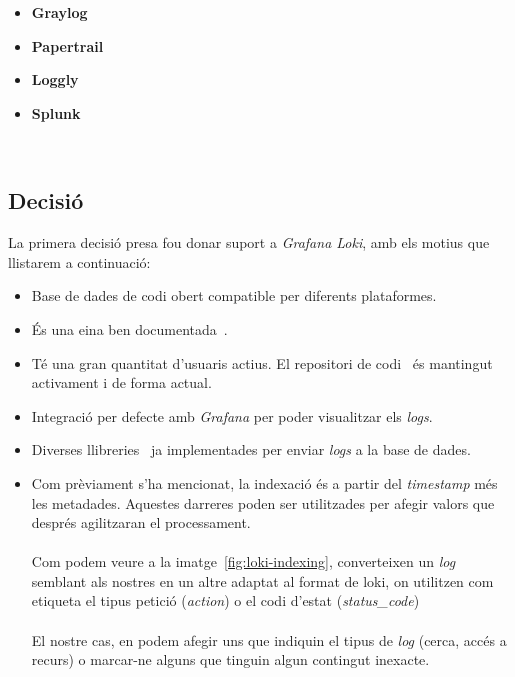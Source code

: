 \begin{itemize}
    \item \textbf{Graylog}~\cite{graylog}
    \item \textbf{Papertrail}~\cite{papertrail}
    \item \textbf{Loggly}~\cite{loggly}
    \item \textbf{Splunk}~\cite{splunk}
\end{itemize}

\noindent \\
\subsection{Decisió}\label{subsec:log-db-decision}

\noindent
La primera decisió presa fou donar suport a \textit{Grafana Loki}, amb els motius que llistarem a continuació:

\begin{itemize}
    \item Base de dades de codi obert compatible per diferents plataformes.
    \item És una eina ben documentada~\cite{loki:documentation}.
    \item Té una gran quantitat d’usuaris actius.
    El repositori de codi~\cite{loki:code} és mantingut activament i de forma actual.
    \item Integració per defecte amb \textit{Grafana} per poder visualitzar els \textit{logs}.
    \item Diverses llibreries~\cite{loki:libraries} ja implementades per enviar \textit{\gls{log}s} a la base de dades.
    \item Com prèviament s’ha mencionat, la indexació és a partir del \textit{\gls{timestamp}} més les metadades.
    Aquestes darreres poden ser utilitzades per afegir valors que després agilitzaran el processament. \\ \\
    Com podem veure a la imatge~\ref{fig:loki-indexing}, converteixen un \textit{\gls{log}} semblant als nostres en un altre adaptat al format de loki, on utilitzen com etiqueta el tipus petició (\textit{action}) o el codi d’estat (\textit{status\_code}) \\ \\
    El nostre cas, en podem afegir uns que indiquin el tipus de \textit{\gls{log}} (cerca, accés a recurs) o marcar-ne alguns que tinguin algun contingut inexacte.
\end{itemize}

